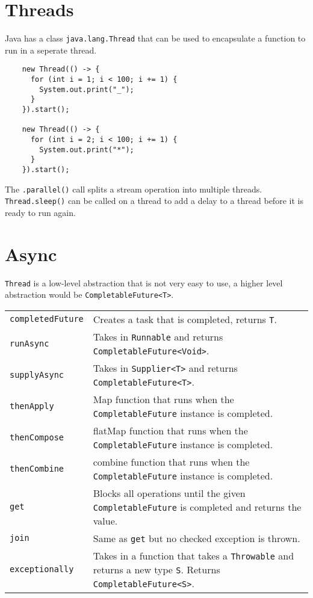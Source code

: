 \documentclass[10pt,landscape,a4paper]{article}
\begin{document}
\begin{multicols*}{4}
\section{Threads}
Java has a class \texttt{java.lang.Thread} that can be used to encapsulate a function to run in a seperate thread.
\begin{lstlisting}
    new Thread(() -> {
      for (int i = 1; i < 100; i += 1) {
        System.out.print("_");
      }
    }).start();

    new Thread(() -> {
      for (int i = 2; i < 100; i += 1) {
        System.out.print("*");
      }
    }).start();
\end{lstlisting}
The \texttt{.parallel()} call splits a stream operation into multiple threads. \\
\texttt{Thread.sleep()} can be called on a thread to add a delay to a thread before it is ready to run again.


\section{Async}
\texttt{Thread} is a low-level abstraction that is not very easy to use, a higher level abstraction would be \texttt{CompletableFuture<T>}.
\begin{tabular}{p{2cm}p{4cm}}
    \verb!completedFuture!  &   Creates a task that is completed, returns \texttt{T}. \\
    \verb!runAsync!         &   Takes in \texttt{Runnable} and returns \texttt{CompletableFuture<Void>}. \\
    \verb!supplyAsync!      &   Takes in \texttt{Supplier<T>} and returns \texttt{CompletableFuture<T>}. \\
    \verb!thenApply!        &   Map function that runs when the \texttt{CompletableFuture} instance is completed. \\
    \verb!thenCompose!      &   flatMap function that runs when the \texttt{CompletableFuture} instance is completed. \\
    \verb!thenCombine!      &   combine function that runs when the \texttt{CompletableFuture} instance is completed. \\ 
    \verb!get!              &   Blocks all operations until the given \texttt{CompletableFuture} is completed and returns the value. \\
    \verb!join!             &   Same as \texttt{get} but no checked exception is thrown. \\
    \verb!exceptionally!    &   Takes in a function that takes a \texttt{Throwable} and returns a new type \texttt{S}. Returns \texttt{CompletableFuture<S>}. \\
\end{tabular}


\end{multicols*}
\end{document}
